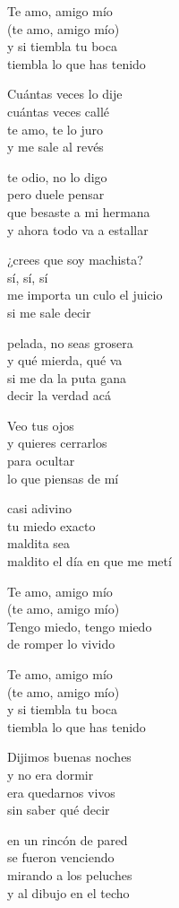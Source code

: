 \begin{lyrics}
Te amo, amigo mío\\
(te amo, amigo mío)\\
y si tiembla tu boca\\
tiembla lo que has tenido

Cuántas veces lo dije\\
cuántas veces callé\\
te amo, te lo juro\\
y me sale al revés

te odio, no lo digo\\
pero duele pensar\\
que besaste a mi hermana\\
y ahora todo va a estallar

¿crees que soy machista?\\
sí, sí, sí\\
me importa un culo el juicio\\
si me sale decir

pelada, no seas grosera\\
y qué mierda, qué va\\
si me da la puta gana\\
decir la verdad acá

Veo tus ojos\\
y quieres cerrarlos\\
para ocultar\\
lo que piensas de mí

casi adivino\\
tu miedo exacto\\
maldita sea\\
maldito el día en que me metí

Te amo, amigo mío\\
(te amo, amigo mío)\\
Tengo miedo, tengo miedo\\
de romper lo vivido

Te amo, amigo mío\\
(te amo, amigo mío)\\
y si tiembla tu boca\\
tiembla lo que has tenido

Dijimos buenas noches\\
y no era dormir\\
era quedarnos vivos\\
sin saber qué decir

en un rincón de pared\\
se fueron venciendo\\
mirando a los peluches\\
y al dibujo en el techo

\end{lyrics}

